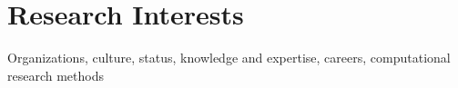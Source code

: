 \section*{Research Interests}
\vspace{\itemsep}

\hspace{\lindent} Organizations, culture, status, knowledge and expertise, careers, computational research methods

\vspace{1.5\itemsep}